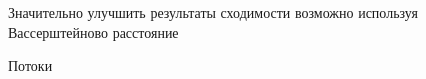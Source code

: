 Значительно улучшить результаты сходимости
 возможно используя Вассерштейново расстояние



Потоки

$$

$$